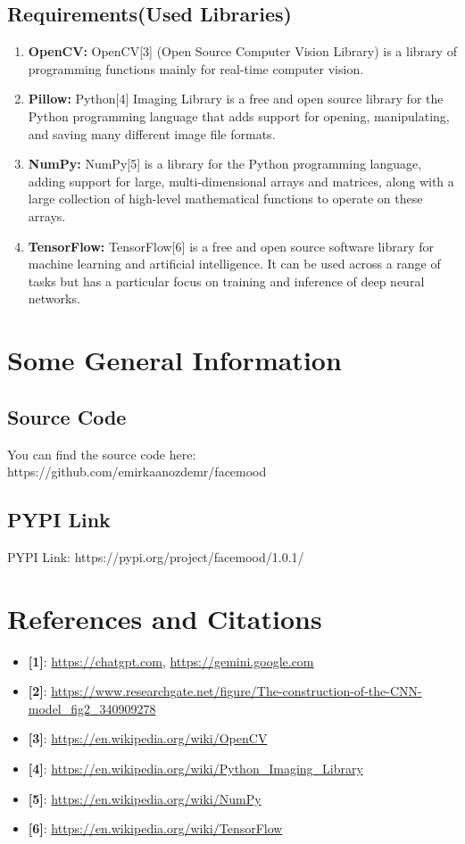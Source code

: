 \documentclass{article}
\begin{document}
\subsection{Requirements(Used Libraries)}
\begin{enumerate}
    \item \textbf{OpenCV:} OpenCV[3] (Open Source Computer Vision Library) is a library of programming functions mainly for real-time computer vision.
    \item \textbf{Pillow:} Python[4] Imaging Library is a free and open source library for the Python programming language that adds support for opening, manipulating, and saving many different image file formats.
    \item \textbf{NumPy:} NumPy[5] is a library for the Python programming language, adding support for large, multi-dimensional arrays and matrices, along with a large collection of high-level mathematical functions to operate on these arrays.
    \item \textbf{TensorFlow:} TensorFlow[6] is a free and open source software library for machine learning and artificial intelligence. It can be used across a range of tasks but has a particular focus on training and inference of deep neural networks.
\end{enumerate}

\vspace{4cm}

\section{Some General Information}
\subsection{Source Code}
You can find the source code here: https://github.com/emirkaanozdemr/facemood
\subsection{PYPI Link}
PYPI Link:
https://pypi.org/project/facemood/1.0.1/

\vspace{7cm}

\section{References and Citations}
\begin{itemize}
    \item \textbf{[1]}: \url{https://chatgpt.com}, \url{https://gemini.google.com}
    \item \textbf{[2]}: \url{https://www.researchgate.net/figure/The-construction-of-the-CNN-model_fig2_340909278}
    \item \textbf{[3]}: \url{https://en.wikipedia.org/wiki/OpenCV}
    \item \textbf{[4]}: \url{https://en.wikipedia.org/wiki/Python_Imaging_Library}
    \item \textbf{[5]}: \url{https://en.wikipedia.org/wiki/NumPy}
    \item \textbf{[6]}: \url{https://en.wikipedia.org/wiki/TensorFlow}
\end{itemize}
\end{document}
